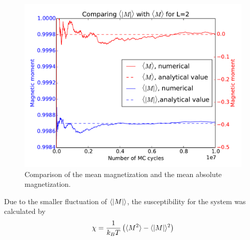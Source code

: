 \begin{figure}[H]
	\centering
	\includegraphics[width=0.7\linewidth]{../results/4b/L_2_mag_magabs}
	\caption{Comparison of the mean magnetization and the mean absolute magnetization. }
	\label{fig:l2magmagabs}
\end{figure}






Due to the smaller fluctuation of  $ \langle \abs{M} \rangle $, the susceptibility for the system was calculated by \begin{equation}
\chi = \frac{1}{k_B T} \left( 	\langle M^2 \rangle - \langle \abs{M}\rangle^2 	\right)\label{eq_X_def_new}
\end{equation}


